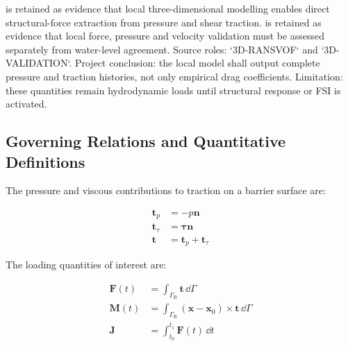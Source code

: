 %

\textcite{qin2018comparison} is retained as evidence that local
three-dimensional modelling enables direct structural-force extraction
from pressure and shear traction. \textcite{watanabe2022validation} is
retained as evidence that local force, pressure and velocity validation
must be assessed separately from water-level agreement. Source roles:
`3D-RANSVOF` and `3D-VALIDATION`. Project conclusion: the local model
shall output complete pressure and traction histories, not only
empirical drag coefficients. Limitation: these quantities remain
hydrodynamic loads until structural response or FSI is activated.

\subsection{Governing Relations and Quantitative Definitions}
\label{sec:res-phy-lod-governing-relations}

%

The pressure and viscous contributions to traction on a barrier
surface are:

\begin{align}
  \mathbf{t}_{p}
  &=
  -p\mathbf{n}
  \label{eq:res-phy-lod-pressure-traction}
  \\
  \mathbf{t}_{\tau}
  &=
  \boldsymbol{\tau}
  \mathbf{n}
  \label{eq:res-phy-lod-shear-traction}
  \\
  \mathbf{t}
  &=
  \mathbf{t}_{p}
  +
  \mathbf{t}_{\tau}
  \label{eq:res-phy-lod-total-traction}
\end{align}

The loading quantities of interest are:

\begin{align}
  \mathbf{F}(t)
  &=
  \int_{\Gamma_{\mathrm{B}}}
  \mathbf{t}
  \,\dd\Gamma
  \label{eq:res-phy-lod-force}
  \\
  \mathbf{M}(t)
  &=
  \int_{\Gamma_{\mathrm{B}}}
  \left(
    \mathbf{x}-\mathbf{x}_0
  \right)
  \times
  \mathbf{t}
  \,\dd\Gamma
  \label{eq:res-phy-lod-moment}
  \\
  \mathbf{J}
  &=
  \int_{t_0}^{t_1}
  \mathbf{F}(t)
  \,\dd t
  \label{eq:res-phy-lod-force-impulse}
\end{align}

